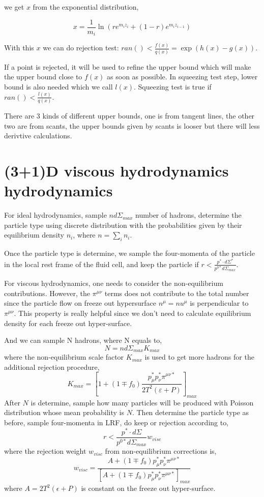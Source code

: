 \documentclass[11pt, oneside]{article}   	%
\begin{document}
we get $x$ from the exponential distribution,

\[
x=\frac{1}{m_{i}}\ln\left(re^{m_{i}z_{i}}+(1-r)e^{m_{i}z_{i-1}}\right)
\]


With this $x$ we can do rejection test: $ran()<\frac{f(x)}{q(x)}=\exp(h(x)-g(x))$.

If a point is rejected, it will be used to refine the upper bound
which will make the upper bound close to $f(x)$ as soon as possible.
In squeezing test step, lower bound is also needed which we call $l(x)$.
Squeezing test is true if $ran()<\frac{l(x)}{q(x)}$. 

There are 3 kinds of different upper bounds, one is from tangent lines,
the other two are from scants, the upper bounds given by scants is
looser but there will less derivtive calculations.



\section{(3+1)D viscous hydrodynamics hydrodynamics}


For ideal hydrodynamics, sample $n d\Sigma_{max}$ number of hadrons, determine the particle type using discrete distribution
with the probabilities given by their equilibrium density $n_i$, where $n=\sum_i n_i$.

Once the particle type is determine, we sample the four-momenta of the particle in the local rest frame of the fluid cell,
and keep the particle if $r<\frac{p^*\cdot d\Sigma^*}{p^{0*}d\Sigma_{max}}$.

For viscous hydrodynamics, one needs to consider the non-equilibrium contributions. However, the $\pi^{\mu\nu}$ terms
does not contribute to the total number since the particle flow on freeze out hypersurface $n^{\mu} = n u^{\mu}$ is perpendicular
to $\pi^{\mu \nu}$. This property is really helpful since we don't need to calculate equilibrium density for each freeze out hyper-surface.

And we can sample N hadrons, where N equals to,
\[
N = n d\Sigma_{max} K_{max}
\]
where the non-equilibrium scale factor $K_{max}$ is used to get more hadrons for the additional rejection procedure,
\[
K_{max} = \left[ 1 + (1 \mp f_0) \frac{p_{\mu}^*p_{\nu}^*\pi^{\mu\nu*}}{2T^2(\varepsilon+P)}\right]_{max}
\]
After $N$ is determine, sample how many particles will be produced with Poisson distribution whose mean probability is $N$.
Then determine the particle type as before, sample four-momenta in LRF, do keep or rejection according to,
\[
r < \frac{p^*\cdot d\Sigma}{p^{0*}d\Sigma_{max}}  w_{visc} 
\]
where the rejection weight $w_{visc}$ from non-equilibrium corrections is,
\[
w_{visc} = \frac{A + (1\mp f_0)p_{\mu}^*p_{\nu}^*\pi^{\mu\nu*}}{\left[ A + (1\mp f_0)p_{\mu}^*p_{\nu}^*\pi^{\mu\nu*}\right]_{max}}
\]
where $A=2T^2(\epsilon+P)$  is constant on the freeze out hyper-surface.
\end{document}
